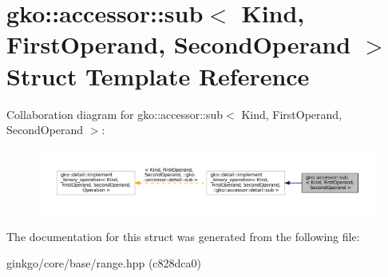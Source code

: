 \hypertarget{structgko_1_1accessor_1_1sub}{}\section{gko\+:\+:accessor\+:\+:sub$<$ Kind, First\+Operand, Second\+Operand $>$ Struct Template Reference}
\label{structgko_1_1accessor_1_1sub}


Collaboration diagram for gko\+:\+:accessor\+:\+:sub$<$ Kind, First\+Operand, Second\+Operand $>$\+:
\nopagebreak
\begin{figure}[H]
\begin{center}
\leavevmode
\includegraphics[width=350pt]{structgko_1_1accessor_1_1sub__coll__graph}
\end{center}
\end{figure}


The documentation for this struct was generated from the following file\+:\begin{DoxyCompactItemize}
\item 
ginkgo/core/base/range.\+hpp (c828dca0)\end{DoxyCompactItemize}

